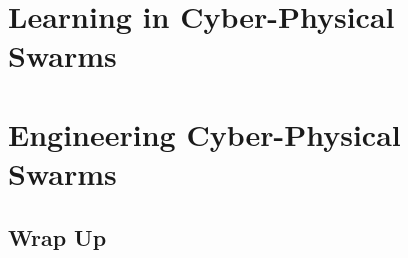 \documentclass[12pt,a4paper,oneside]{book}
\begin{document}
\part{Learning in Cyber-Physical Swarms}
\begin{refsection}\end{refsection}
\begin{refsection}\end{refsection}
\begin{refsection}\end{refsection}
\begin{refsection}\end{refsection}
\begin{refsection}\end{refsection}

\part{Engineering Cyber-Physical Swarms}
\begin{refsection}\end{refsection}
\begin{refsection}\end{refsection}
\begin{refsection}\end{refsection}
\begin{refsection}\end{refsection}
\begin{refsection}\end{refsection}
\begin{refsection}\end{refsection}

\chapter{Wrap Up}

\end{document}
